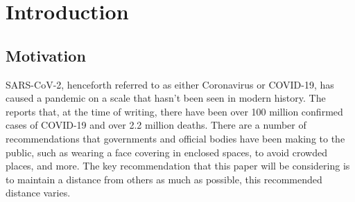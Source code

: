 \documentclass{l4proj}
\begin{document}
\tableofcontents

%
%
%
%
%
%
%
%
\chapter{Introduction}



\section{Motivation}

SARS-CoV-2, henceforth referred to as either Coronavirus or COVID-19, has caused a pandemic on a scale that hasn't been seen in modern history. The \citet{world_health_organisation_dashboard_2021} reports that, at the time of writing, there have been over 100 million confirmed cases of COVID-19 and over 2.2 million deaths. There are a number of recommendations that governments and official bodies have been making to the public, such as wearing a face covering in enclosed spaces, to avoid crowded places, and more. The key recommendation that this paper will be considering is to maintain a distance from others as much as possible, this recommended distance varies.
\end{document}
